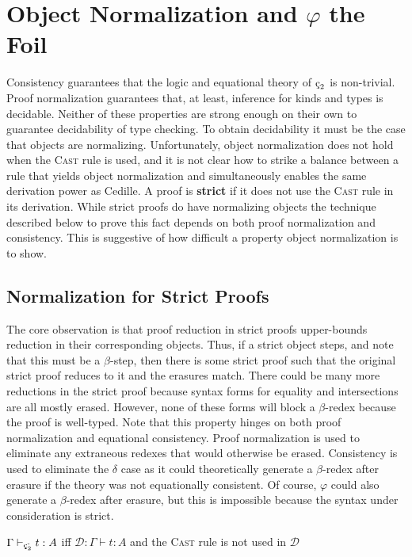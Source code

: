 \chapter{Object Normalization and \texorpdfstring{$\varphi$}{Phi} the Foil}
\label{chap:5}

Consistency guarantees that the logic and equational theory of $\ced$ is non-trivial.
Proof normalization guarantees that, at least, inference for kinds and types is decidable.
Neither of these properties are strong enough on their own to guarantee decidability of type checking.
To obtain decidability it must be the case that objects are normalizing.
Unfortunately, object normalization does not hold when the \textsc{Cast} rule is used, and it is not clear how to strike a balance between a rule that yields object normalization and simultaneously enables the same derivation power as Cedille.
A proof is \textbf{strict} if it does not use the \textsc{Cast} rule in its derivation.
While strict proofs do have normalizing objects the technique described below to prove this fact depends on both proof normalization and consistency.
This is suggestive of how difficult a property object normalization is to show.

\section{Normalization for Strict Proofs}

The core observation is that proof reduction in strict proofs upper-bounds reduction in their corresponding objects.
Thus, if a strict object steps, and note that this must be a $\beta$-step, then there is some strict proof such that the original strict proof reduces to it and the erasures match.
There could be many more reductions in the strict proof because syntax forms for equality and intersections are all mostly erased.
However, none of these forms will block a $\beta$-redex because the proof is well-typed.
Note that this property hinges on both proof normalization and equational consistency.
Proof normalization is used to eliminate any extraneous redexes that would otherwise be erased.
Consistency is used to eliminate the $\delta$ case as it could theoretically generate a $\beta$-redex after erasure if the theory was not equationally consistent.
Of course, $\varphi$ could also generate a $\beta$-redex after erasure, but this is impossible because the syntax under consideration is strict.

\begin{definition}
    $\Gamma \vdash_{\ced^\text{-}} t : A$ iff $\mathcal{D} : \Gamma \vdash t : A$ and the \textnormal{\textsc{Cast}} rule is not used in $\mathcal{D}$
\end{definition}

